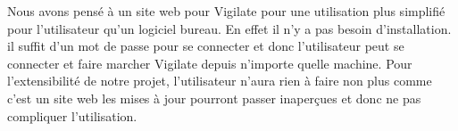 Nous avons pensé à un site web pour Vigilate pour une utilisation plus simplifié pour l'utilisateur qu'un logiciel bureau. En effet il n'y a pas besoin d'installation. il suffit d'un mot de passe pour se connecter et donc l'utilisateur peut se connecter et faire marcher Vigilate depuis n'importe quelle machine.
Pour l'extensibilité de notre projet, l'utilisateur n'aura rien à faire non plus comme c'est un site web les mises à jour pourront passer inaperçues et donc ne pas compliquer l'utilisation. 